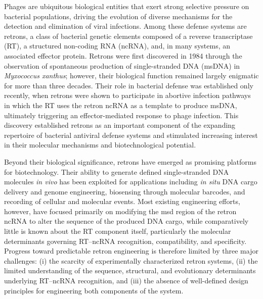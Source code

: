 


Phages are ubiquitous biological entities that exert strong selective pressure on bacterial populations, driving the evolution of diverse mechanisms for the detection and elimination of viral infections. Among these defense systems are retrons, a class of bacterial genetic elements composed of a reverse transcriptase (RT), a structured non-coding RNA (ncRNA), and, in many systems, an associated effector protein. Retrons were first discovered in 1984 through the observation of spontaneous production of single-stranded DNA (msDNA) in \textit{Myxococcus xanthus}; however, their biological function remained largely enigmatic for more than three decades. Their role in bacterial defense was established only recently, when retrons were shown to participate in abortive infection pathways in which the RT uses the retron ncRNA as a template to produce msDNA, ultimately triggering an effector-mediated response to phage infection. This discovery established retrons as an important component of the expanding repertoire of bacterial antiviral defense systems and stimulated increasing interest in their molecular mechanisms and biotechnological potential.

Beyond their biological significance, retrons have emerged as promising platforms for biotechnology. Their ability to generate defined single-stranded DNA molecules \textit{in vivo} has been exploited for applications including \textit{in situ} DNA cargo delivery and genome engineering, biosensing through molecular barcodes, and recording of cellular and molecular events. Most existing engineering efforts, however, have focused primarily on modifying the msd region of the retron ncRNA to alter the sequence of the produced DNA cargo, while comparatively little is known about the RT component itself, particularly the molecular determinants governing RT--ncRNA recognition, compatibility, and specificity. Progress toward predictable retron engineering is therefore limited by three major challenges: (i) the scarcity of experimentally characterized retron systems, (ii) the limited understanding of the sequence, structural, and evolutionary determinants underlying RT--ncRNA recognition, and (iii) the absence of well-defined design principles for engineering both components of the system.

